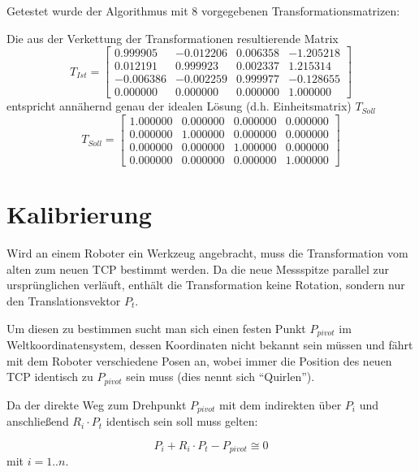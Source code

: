 \documentclass[11pt, a4paper]{article}
\begin{document}
Getestet wurde der Algorithmus mit 8 vorgegebenen Transformationsmatrizen:

Die aus der Verkettung der Transformationen resultierende Matrix
\begin{equation*}
T_{Ist} = \begin{bmatrix}
0.999905    &    -0.012206   &    0.006358    &    -1.205218 \\
0.012191    &    0.999923    &    0.002337    &    1.215314 \\
-0.006386   &    -0.002259   &    0.999977    &    -0.128655 \\
0.000000    &    0.000000    &    0.000000    &    1.000000
\end{bmatrix}
\end{equation*}
entspricht annähernd genau der idealen Lösung (d.h. Einheitsmatrix) $T_{Soll}$
\begin{equation*}
T_{Soll} = \begin{bmatrix}
1.000000    &    0.000000    &    0.000000   &     0.000000 \\
0.000000    &    1.000000    &    0.000000   &     0.000000 \\
0.000000    &    0.000000    &    1.000000   &     0.000000 \\
0.000000    &    0.000000    &    0.000000   &     1.000000
\end{bmatrix}
\end{equation*}
\newpage
\section{Kalibrierung}
Wird an einem Roboter ein Werkzeug angebracht, muss die Transformation vom alten zum neuen TCP bestimmt werden. Da die neue Messspitze parallel zur ursprünglichen verläuft, enthält die Transformation keine Rotation, sondern nur den Translationsvektor $P_t$.

Um diesen zu bestimmen sucht man sich einen festen Punkt $P_{pivot}$ im Weltkoordinatensystem, dessen Koordinaten nicht bekannt sein müssen und fährt mit dem Roboter verschiedene Posen an, wobei immer die Position des neuen TCP identisch zu $P_{pivot}$ sein muss (dies nennt sich \enquote{Quirlen}).

Da der direkte Weg zum Drehpunkt $P_{pivot}$ mit dem indirekten über $P_i$ und anschließend $R_i \cdot P_t$ identisch sein soll muss gelten:

\begin{equation*}
P_i + R_i \cdot P_t - P_{pivot} \cong 0
\end{equation*}
 mit $i = 1..n$.
\end{document}
